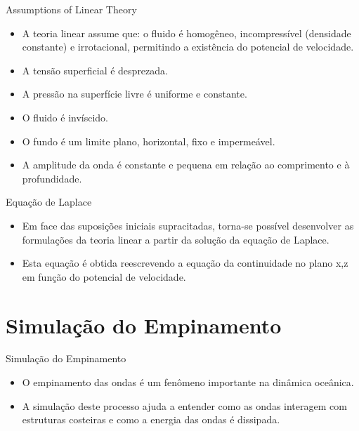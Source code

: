 \documentclass[aspectratio=169,xcolor=table]{beamer}
\begin{document}
\begin{frame}{Assumptions of Linear Theory}
    \begin{itemize}
        \item A teoria linear assume que: o fluido é homogêneo, incompressível (densidade constante) e irrotacional, permitindo a existência do potencial de velocidade.
        \item A tensão superficial é desprezada.
        \item A pressão na superfície livre é uniforme e constante.
        \item O fluido é invíscido.
        \item O fundo é um limite plano, horizontal, fixo e impermeável.
        \item A amplitude da onda é constante e pequena em relação ao comprimento e à profundidade.
    \end{itemize}
\end{frame}

\begin{frame}{Equação de Laplace}
    \begin{itemize}
        \item Em face das suposições iniciais supracitadas, torna-se possível desenvolver as formulações da teoria linear a partir da solução da equação de Laplace.
        \item Esta equação é obtida reescrevendo a equação da continuidade no plano x,z em função do potencial de velocidade.
    \end{itemize}
\end{frame}

\section{Simulação do Empinamento}
\begin{frame}{Simulação do Empinamento}
    \begin{itemize}
        \item O empinamento das ondas é um fenômeno importante na dinâmica oceânica.
        \item A simulação deste processo ajuda a entender como as ondas interagem com estruturas costeiras e como a energia das ondas é dissipada.
    \end{itemize}
\end{frame}

\end{document}
